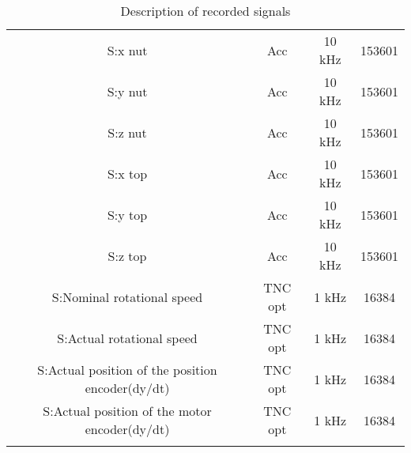 \begin{center}
\begin{longtable}{c c c c}
 S:x nut & Acc & 10 kHz & 153601 \\ 

 S:y nut & Acc & 10 kHz & 153601 \\ 

 S:z nut & Acc & 10 kHz & 153601 \\ 

 S:x top & Acc & 10 kHz & 153601 \\ 

 S:y top & Acc & 10 kHz & 153601 \\ 
 
 S:z top & Acc & 10 kHz & 153601 \\ 
 
 S:Nominal rotational speed & TNC opt & 1 kHz & 16384 \\
 
 S:Actual rotational speed & TNC opt & 1 kHz & 16384 \\ 
 
 S:Actual position of the position encoder(dy/dt) & TNC opt & 1 kHz & 16384 \\ 
 S:Actual position of the motor encoder(dy/dt)  & TNC opt & 1 kHz & 16384  \\ [1ex] 
 \bottomrule
\caption {Description of recorded signals}
\label {tab:description_of_the_49_recorded_features}
\end{longtable}
\end{center}


